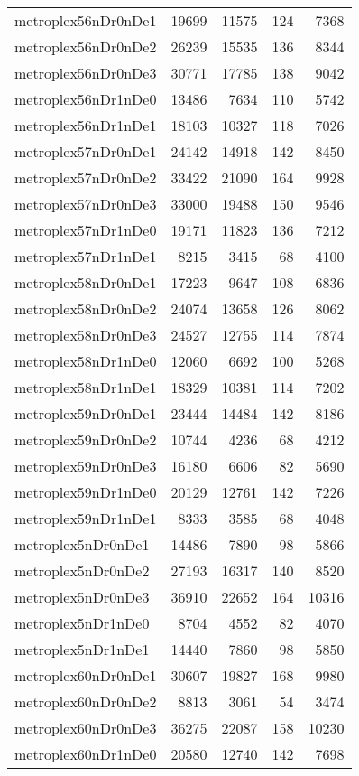 \begin{longtable}{lrrrr}
metroplex56nDr0nDe1 & 19699 & 11575 & 124 & 7368 \\
metroplex56nDr0nDe2 & 26239 & 15535 & 136 & 8344 \\
metroplex56nDr0nDe3 & 30771 & 17785 & 138 & 9042 \\
metroplex56nDr1nDe0 & 13486 & 7634 & 110 & 5742 \\
metroplex56nDr1nDe1 & 18103 & 10327 & 118 & 7026 \\
metroplex57nDr0nDe1 & 24142 & 14918 & 142 & 8450 \\
metroplex57nDr0nDe2 & 33422 & 21090 & 164 & 9928 \\
metroplex57nDr0nDe3 & 33000 & 19488 & 150 & 9546 \\
metroplex57nDr1nDe0 & 19171 & 11823 & 136 & 7212 \\
metroplex57nDr1nDe1 & 8215 & 3415 & 68 & 4100 \\
metroplex58nDr0nDe1 & 17223 & 9647 & 108 & 6836 \\
metroplex58nDr0nDe2 & 24074 & 13658 & 126 & 8062 \\
metroplex58nDr0nDe3 & 24527 & 12755 & 114 & 7874 \\
metroplex58nDr1nDe0 & 12060 & 6692 & 100 & 5268 \\
metroplex58nDr1nDe1 & 18329 & 10381 & 114 & 7202 \\
metroplex59nDr0nDe1 & 23444 & 14484 & 142 & 8186 \\
metroplex59nDr0nDe2 & 10744 & 4236 & 68 & 4212 \\
metroplex59nDr0nDe3 & 16180 & 6606 & 82 & 5690 \\
metroplex59nDr1nDe0 & 20129 & 12761 & 142 & 7226 \\
metroplex59nDr1nDe1 & 8333 & 3585 & 68 & 4048 \\
metroplex5nDr0nDe1 & 14486 & 7890 & 98 & 5866 \\
metroplex5nDr0nDe2 & 27193 & 16317 & 140 & 8520 \\
metroplex5nDr0nDe3 & 36910 & 22652 & 164 & 10316 \\
metroplex5nDr1nDe0 & 8704 & 4552 & 82 & 4070 \\
metroplex5nDr1nDe1 & 14440 & 7860 & 98 & 5850 \\
metroplex60nDr0nDe1 & 30607 & 19827 & 168 & 9980 \\
metroplex60nDr0nDe2 & 8813 & 3061 & 54 & 3474 \\
metroplex60nDr0nDe3 & 36275 & 22087 & 158 & 10230 \\
metroplex60nDr1nDe0 & 20580 & 12740 & 142 & 7698 \\

\end{longtable}
